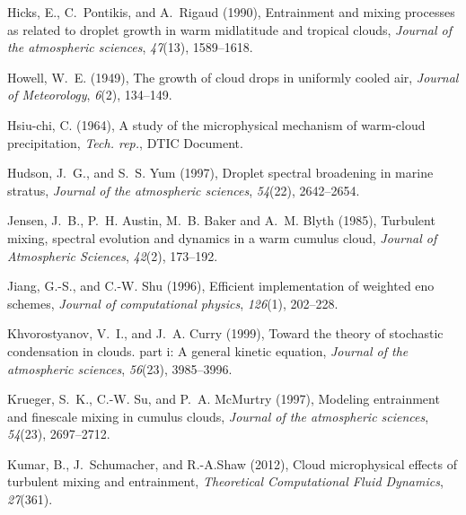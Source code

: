 \documentclass[draft,linenumbers]{agujournal}
\begin{document}
\begin{thebibliography}{60}
Hicks, E., C.~Pontikis, and A.~Rigaud (1990), Entrainment and mixing processes
  as related to droplet growth in warm midlatitude and tropical clouds,
  \textit{Journal of the atmospheric sciences}, \textit{47}(13), 1589--1618.

Howell, W.~E. (1949), The growth of cloud drops in uniformly cooled air,
  \textit{Journal of Meteorology}, \textit{6}(2), 134--149.

Hsiu-chi, C. (1964), A study of the microphysical mechanism of warm-cloud
  precipitation, \textit{Tech. rep.}, DTIC Document.

Hudson, J.~G., and S.~S. Yum (1997), Droplet spectral broadening in marine
  stratus, \textit{Journal of the atmospheric sciences}, \textit{54}(22),
  2642--2654.

Jensen, J.~B., P.~H. Austin, M.~B. Baker and A.~M. Blyth (1985), Turbulent mixing, spectral evolution and dynamics in a warm cumulus cloud, \textit{Journal of Atmospheric Sciences},
  \textit{42}(2), 173--192.
  
Jiang, G.-S., and C.-W. Shu (1996), Efficient implementation of weighted eno
  schemes, \textit{Journal of computational physics}, \textit{126}(1),
  202--228.

Khvorostyanov, V.~I., and J.~A. Curry (1999), Toward the theory of stochastic
  condensation in clouds. part i: A general kinetic equation, \textit{Journal
  of the atmospheric sciences}, \textit{56}(23), 3985--3996.

Krueger, S.~K., C.-W. Su, and P.~A. McMurtry (1997), Modeling entrainment and
  finescale mixing in cumulus clouds, \textit{Journal of the atmospheric
  sciences}, \textit{54}(23), 2697--2712.

Kumar, B., J.~Schumacher, and R.-A.Shaw (2012{}), Cloud
  microphysical effects of turbulent mixing and entrainment,
  \textit{Theoretical Computational Fluid Dynamics}, \textit{27}(361).


\end{thebibliography}
\end{document}
